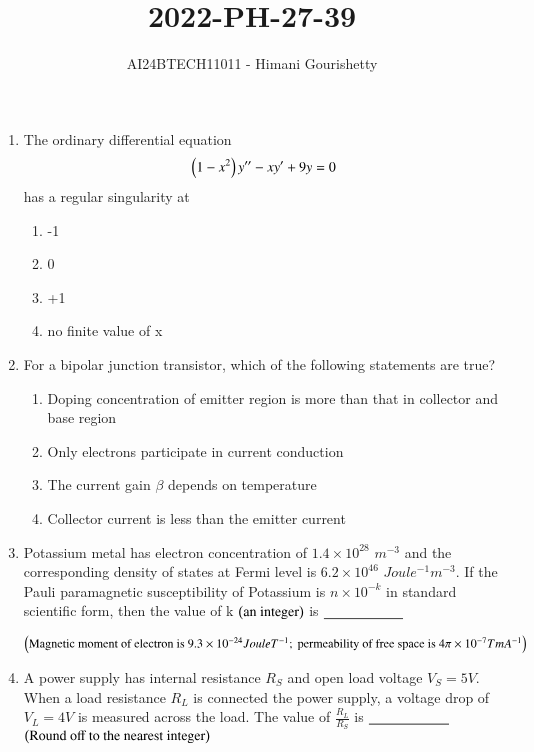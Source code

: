 \documentclass[journal,12pt,onecolumn]{IEEEtran}
\theoremstyle{remark}
\begin{document}

\vspace{3cm}

\title{2022-PH-27-39}
\author{AI24BTECH11011 - Himani Gourishetty}
\maketitle
\bigskip

\renewcommand{\thefigure}{\theenumi}
\renewcommand{\thetable}{\theenumi}
\begin{enumerate}

\item The ordinary differential equation
$$\left(1 - x^2\right)y'' - xy' + 9y = 0$$
has a regular singularity at
\begin{enumerate}
    \item -1
    \item 0
    \item +1
    \item no finite value of x
\end{enumerate}

\item For a bipolar junction transistor, which of the following statements are true?
\begin{enumerate}
    \item Doping concentration of emitter region is more than that in collector and base region
    \item Only electrons participate in current conduction
    \item The current gain $\beta$ depends on temperature
    \item Collector current is less than the emitter current
\end{enumerate}

\item Potassium metal has electron concentration of $1.4 \times 10^{28}$  $m^{-3}$ and the corresponding density of states at Fermi level is $6.2 \times 10^{46}$ $Joule^{-1} m^{-3}$. If the Pauli paramagnetic susceptibility of Potassium is $n\times 10^{-k}$ in standard scientific form, then the value of k $\left(\text{an integer}\right)$ is $\makebox[2cm][l]{\underline{\hspace{2cm}}}$

$\left(\text{Magnetic moment of electron is } 9.3 \times 10^{-24} Joule T^{-1} ; \text{ permeability of free space is } 4\pi \times 10^{-7} TmA^{-1}\right)$

\item A power supply has internal resistance $R_S$ and open load voltage $V_S= 5V$. When a load resistance $R_L$ is connected the power supply, a voltage drop of $V_L = 4V$ is measured across the load. The value of $\frac{R_L}{R_S}$ is $\makebox[2cm][l]{\underline{\hspace{2cm}}}$
$\left(\text{Round off to the nearest integer}\right)$


\end{enumerate}
\end{document}
